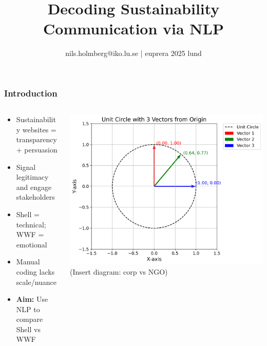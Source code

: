 \documentclass[aspectratio=1610]{beamer}
\title{Decoding Sustainability\\Communication via NLP}
\author{nils.holmberg@iko.lu.se | euprera 2025 lund}
\begin{document}
\let\olditem\item
\renewcommand{\item}{\olditem\vspace{8pt}} %
\setlength{\itemsep}{8pt}  %
\setlength{\parskip}{8pt}  %

\begin{frame}[plain]
  \titlepage
\end{frame}

\begin{frame}
  \frametitle{Introduction}
  \begin{columns}[t]
    \begin{column}[t]{0.5\textwidth}
      \begin{itemize}
        \item Sustainability websites = transparency + persuasion
        \item Signal legitimacy and engage stakeholders
        \item Shell = technical; WWF = emotional
        \item Manual coding lacks scale/nuance
        \item \textbf{Aim:} Use NLP to compare Shell vs WWF
      \end{itemize}
    \end{column}
    \begin{column}[t]{0.5\textwidth}
      \vspace*{0pt}
      \includegraphics[width=\linewidth]{../../fig/unit_circle_vectors.png}
      (Insert diagram: corp vs NGO)
    \end{column}
  \end{columns}
\end{frame}
\end{document}
